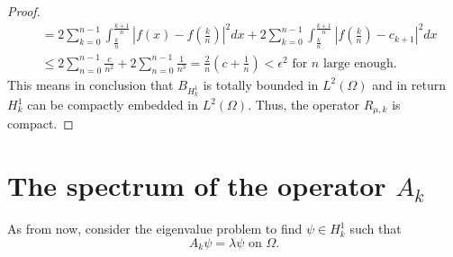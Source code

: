 \begin{theorem}
\begin{proof}
\begin{align*}
				& =  2 \sum_{k = 0}^{n-1} \int_{\frac{k}{n}}^{\frac{k+1}{n}} | f(x) - f(\frac{k}{n}) |^{2} dx +  2 \sum_{k = 0}^{n-1} \int_{\frac{k}{n}}^{\frac{k+1}{n}} | f(\frac{k}{n}) - c_{k+1} |^{2} dx \\
				& \leq 2 \sum_{n = 0}^{n-1} \frac{c}{n^{2}} + 2 \sum_{n=0}^{n-1} \frac{1}{n^{3}} = \frac{2}{n} \left( c + \frac{1}{n} \right) < \epsilon^{2} \text{ for } n \text{ large enough.}
		\end{align*}		 
	This means in conclusion that $B_{H^{1}_{k}}$ is totally bounded in $L^{2}(\Omega)$ and in return $H^{1}_{k}$ can be compactly embedded in $L^{2}(\Omega)$. Thus, the operator $R_{\mu, k}$ is compact.
	\end{proof}	
\end{theorem}		

\section{The spectrum of the operator $A_{k}$}	
As from now, consider the eigenvalue problem to find $\psi \in H^{1}_{k}$ such that
	\begin{equation}
		A_{k} \psi = \lambda \psi \text{ on } \Omega. \label{eigv-problem}
	\end{equation}
	
